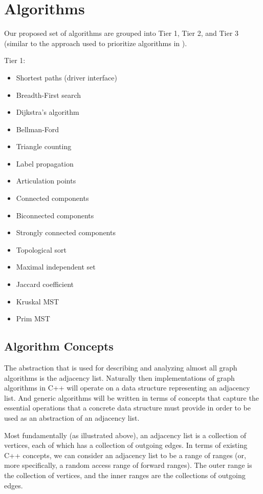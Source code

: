 \chapter{Algorithms}

Our proposed set of algorithms are grouped into Tier 1, Tier 2, and Tier 3 (similar to the approach used to prioritize algorithms in ).

Tier 1:
\begin{itemize}
\item Shortest paths (driver interface)
\item Breadth-First search
\item Dijkstra's algorithm
\item Bellman-Ford
\item Triangle counting
\item Label propagation
\item Articulation points
\item Connected components
\item Biconnected components
\item Strongly connected components  
\item Topological sort
\item Maximal independent set
\item Jaccard coefficient
\item Kruskal MST
\item Prim MST
\end{itemize}

\section{Algorithm Concepts}


The abstraction that is used for describing and analyzing almost all graph algorithms is the adjacency list.  Naturally then implementations of graph algorithms in C++ will operate on a data structure representing an adjacency list.  And generic algorithms will be written in terms of concepts that capture the essential operations that a concrete data structure must provide in order to be used as an abstraction of an adjacency list.

Most fundamentally (as illustrated above), an adjacency list is a collection of vertices, each of which has a collection of outgoing edges.  In terms of existing C++ concepts, we can consider an adjacency list to be a range of ranges (or, more specifically, a random access range of forward ranges).  The outer range is the collection of vertices, and the inner ranges are the collections of outgoing edges.

